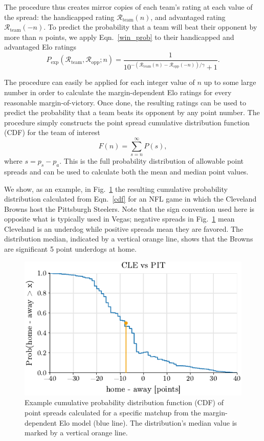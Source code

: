 \documentclass[aps,prc,reprint,amsmath,superscriptaddress,nofootinbib]{revtex4-1}
\newcommand{\R}{\mathcal{R}}
\begin{document}
The procedure thus creates mirror copies of each team's rating at each value of the spread: the handicapped rating $\R_\text{team}(n)$, and advantaged rating $\R_\text{team}(-n)$.
To predict the probability that a team will beat their opponent by more than $n$ points, we apply Eqn.~\eqref{win_prob} to their handicapped and advantaged Elo ratings
\begin{equation}
  \label{win_prob_hcap}
  P_\text{exp}(\R_\text{team}, \R_\text{opp}; n) = \frac{1}{10^{-(\R_\text{team}(n) - \R_\text{opp}(-n))/\gamma} + 1}.
\end{equation}

The procedure can easily be applied for each integer value of $n$ up to some large number in order to calculate the margin-dependent Elo ratings for every reasonable margin-of-victory.
Once done, the resulting ratings can be used to predict the probability that a team beats its opponent by any point number.
The procedure simply constructs the point spread cumulative distribution function (CDF) for the team of interest
\begin{equation}
  \label{cdf}
  F(n) = \sum_{s=n}^\infty P(s),
\end{equation}
where $s = p_s - p_a$.
This is the full probability distribution of allowable point spreads and can be used to calculate both the mean and median point values.

We show, as an example, in Fig.~\ref{fig:example} the resulting cumulative probability distribution calculated from Eqn.~\eqref{cdf} for an NFL game in which the Cleveland Browns host the Pittsburgh Steelers. 
Note that the sign convention used here is opposite what is typically used in Vegas; negative spreads in Fig.~\ref{fig:example} mean Cleveland is an underdog while positive spreads mean they are favored.
The distribution median, indicated by a vertical orange line, shows that the Browns are significant 5 point underdogs at home.

\begin{figure}
  \includegraphics{example_distribution}
  \caption{\label{fig:example} Example cumulative probability distribution function (CDF) of point spreads calculated for a specific matchup from the margin-dependent Elo model (blue line). The distribution's median value is marked by a vertical orange line.}
\end{figure}
\end{document}
